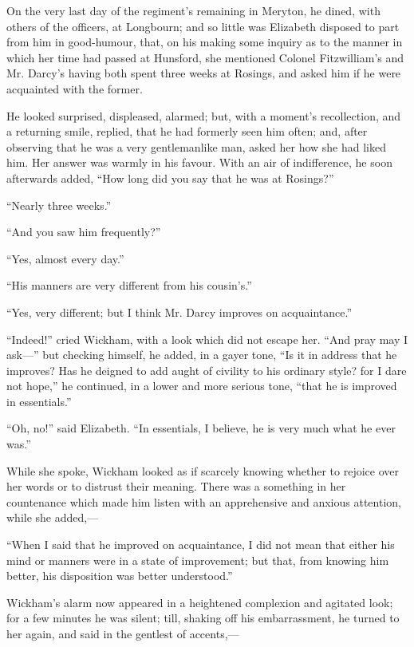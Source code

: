 On the very last day of the regiment's remaining in Meryton, he dined, with others of the officers, at Longbourn; and so little was Elizabeth disposed to part from him in good-humour, that, on his making some inquiry as to the manner in which her time had passed at Hunsford, she mentioned Colonel Fitzwilliam's and Mr. Darcy's having both spent three weeks at Rosings, and asked him if he were acquainted with the former.

He looked surprised, displeased, alarmed; but, with a moment's recollection, and a returning smile, replied, that he had formerly seen him often; and, after observing that he was a very gentlemanlike man, asked her how she had liked him. Her answer was warmly in his favour. With an air of indifference, he soon afterwards added, ``How long did you say that he was at Rosings?''

``Nearly three weeks.''

``And you saw him frequently?''

``Yes, almost every day.''

``His manners are very different from his cousin's.''

``Yes, very different; but I think Mr. Darcy improves on acquaintance.''

``Indeed!'' cried Wickham, with a look which did not escape her. ``And pray may I ask---'' but checking himself, he added, in a gayer tone, ``Is it in address that he improves? Has he deigned to add aught of civility to his ordinary style? for I dare not hope,'' he continued, in a lower and more serious tone, ``that he is improved in essentials.''

``Oh, no!'' said Elizabeth. ``In essentials, I believe, he is very much what he ever was.''

While she spoke, Wickham looked as if scarcely knowing whether to rejoice over her words or to distrust their meaning. There was a something in her countenance which made him listen with an apprehensive and anxious attention, while she added,---

``When I said that he improved on acquaintance, I did not mean that either his mind or manners were in a state of improvement; but that, from knowing him better, his disposition was better understood.''

Wickham's alarm now appeared in a heightened complexion and agitated look; for a few minutes he was silent; till, shaking off his embarrassment, he turned to her again, and said in the gentlest of accents,---

